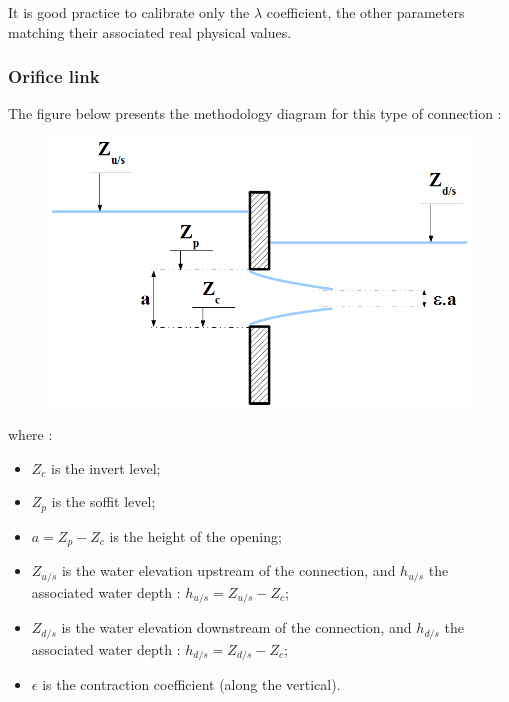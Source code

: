 It is good practice to calibrate only the $\lambda$ coefficient, the other parameters matching their associated real physical values.



\subsubsection{Orifice link}

The figure below presents the methodology diagram for this type of connection :

\begin{figure}[h]
 \begin{center}
  \includegraphics[scale=1.]{Figures/Lorifice.eps}
 \end{center}
\end{figure}

where :
\begin{itemize}
 \item $Z_c$ is the invert level;
 \item $Z_p$ is the soffit level;
 \item $a=Z_p - Z_c$ is the height of the opening;
 \item $Z_{u/s}$ is the water elevation upstream of the connection, and $h_{u/s}$ the associated water depth : $h_{u/s} = Z_{u/s}-Z_c$;
 \item $Z_{d/s}$ is the water elevation downstream of the connection, and $h_{d/s}$ the associated water depth : $h_{d/s} = Z_{d/s}-Z_c$;
 \item $\epsilon$ is the contraction coefficient (along the vertical).
\end{itemize}

\vspace{0.5cm}

